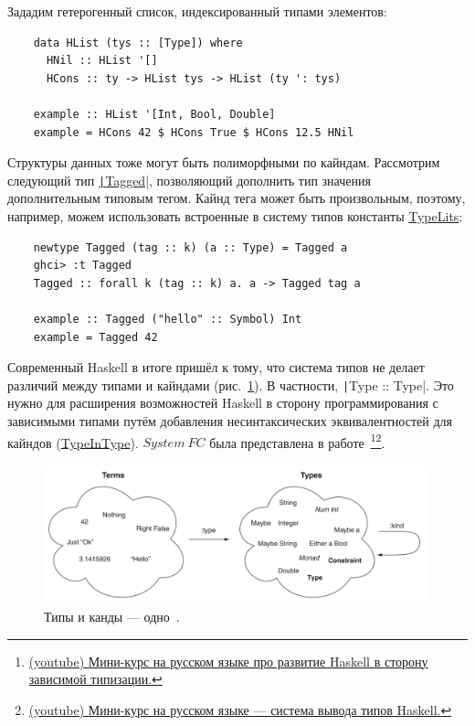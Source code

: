 Зададим гетерогенный список, индексированный типами элементов:
\begin{verbatim}
    data HList (tys :: [Type]) where
      HNil :: HList '[]
      HCons :: ty -> HList tys -> HList (ty ': tys)

    example :: HList '[Int, Bool, Double]
    example = HCons 42 $ HCons True $ HCons 12.5 HNil
\end{verbatim}

Структуры данных тоже могут быть полиморфными по кайндам.
Рассмотрим следующий тип \href{https://hackage.haskell.org/package/tagged-0.8.8/docs/Data-Tagged.html#t:Tagged}{\texttt|Tagged|}, позволяющий дополнить тип значения дополнительным типовым тегом.
Кайнд тега может быть произвольным, поэтому, например, можем использовать встроенные в систему типов константы \href{https://ghc.gitlab.haskell.org/ghc/doc/users_guide/exts/type_literals.html}{TypeLits}:
\begin{verbatim}
    newtype Tagged (tag :: k) (a :: Type) = Tagged a
    ghci> :t Tagged
    Tagged :: forall k (tag :: k) a. a -> Tagged tag a

    example :: Tagged ("hello" :: Symbol) Int
    example = Tagged 42
\end{verbatim}

Современный Haskell в итоге пришёл к тому, что система типов не делает различий между типами и кайндами (рис.~\ref{fig:types-eq-kinds}).
В частности, \texttt|Type :: Type|.
Это нужно для расширения возможностей Haskell в сторону программирования с зависимыми типами путём добавления несинтаксических эквивалентностей для кайндов (\href{https://ghc.gitlab.haskell.org/ghc/doc/users_guide/exts/poly_kinds.html#extension-TypeInType}{TypeInType}).
$System~FC$ была представлена в работе~\cite{weirich2013system}\footnote{\href{https://www.youtube.com/watch?v=ISGENChlA4M&list=PLvPsfYrGz3wufQguebnCduYgQQ9UMeJRt}{(youtube) Мини-курс на русском языке про развитие Haskell в сторону зависимой типизации.}}\footnote{\href{https://www.youtube.com/watch?v=_HYI7zjkrEs&list=PLvPsfYrGz3wuVAGhNf6-i7uafXg56oqM5&index=1}{(youtube) Мини-курс на русском языке --- система вывода типов Haskell.}}.

\begin{figure}
    \centering
    \includegraphics[width=0.99\textwidth]{figs/types-eq-kinds}
    \caption{Типы и канды --- одно~\cite{bragilevsky-haskell}.}
    \label{fig:types-eq-kinds}
\end{figure}

